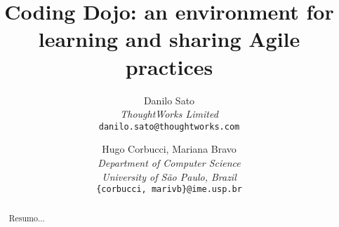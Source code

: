 \documentclass[times, 10pt,twocolumn]{article}
\begin{document}
\title{Coding Dojo: an environment for learning and sharing Agile practices}

\author{Danilo Sato\\
\textit{ThoughtWorks Limited}\\ 
{\tt danilo.sato@thoughtworks.com}\\
\and
Hugo Corbucci, Mariana Bravo\\
\textit{Department of Computer Science}\\
\textit{University of São Paulo, Brazil}\\
{\tt \{corbucci, marivb\}@ime.usp.br}
}

\maketitle
\thispagestyle{empty}

\begin{abstract}
   Resumo... 
\end{abstract}









\end{document}
